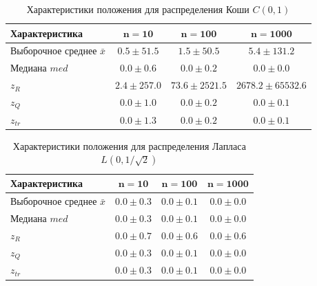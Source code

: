 \documentclass[a4paper, 14pt]{extarticle}
\begin{document}
\begin{table}[H]
    \centering
    \caption{Характеристики положения для распределения Коши $C(0, 1)$}
    \label{tab:res_cauchy}
    \begin{tabular}{|l|c|c|c|}
        \hline
        \textbf{Характеристика} & $\mathbf{n=10}$ & $\mathbf{n=100}$ & $\mathbf{n=1000}$ \\ \hline
        Выборочное среднее $\bar{x}$ & $0.5 \pm 51.5$ & $1.5 \pm 50.5$ & $5.4 \pm 131.2$ \\ \hline
        Медиана $med$ & $0.0 \pm 0.6$ & $0.0 \pm 0.2$ & $0.0 \pm 0.0$ \\ \hline
        $z_R$ & $2.4 \pm 257.0$ & $73.6 \pm 2521.5$ & $2678.2 \pm 65532.6$ \\ \hline
        $z_Q$ & $0.0 \pm 1.0$ & $0.0 \pm 0.2$ & $0.0 \pm 0.1$ \\ \hline
        $z_{tr}$ & $0.0 \pm 1.3$ & $0.0 \pm 0.2$ & $0.0 \pm 0.1$ \\ \hline
    \end{tabular}
\end{table}

\begin{table}[H]
    \centering
    \caption{Характеристики положения для распределения Лапласа $L(0, 1/\sqrt{2})$}
    \label{tab:res_laplace}
    \begin{tabular}{|l|c|c|c|}
        \hline
        \textbf{Характеристика} & $\mathbf{n=10}$ & $\mathbf{n=100}$ & $\mathbf{n=1000}$ \\ \hline
        Выборочное среднее $\bar{x}$ & $0.0 \pm 0.3$ & $0.0 \pm 0.1$ & $0.0 \pm 0.0$ \\ \hline
        Медиана $med$ & $0.0 \pm 0.3$ & $0.0 \pm 0.1$ & $0.0 \pm 0.0$ \\ \hline
        $z_R$ & $0.0 \pm 0.7$ & $0.0 \pm 0.6$ & $0.0 \pm 0.6$ \\ \hline
        $z_Q$ & $0.0 \pm 0.3$ & $0.0 \pm 0.1$ & $0.0 \pm 0.0$ \\ \hline
        $z_{tr}$ & $0.0 \pm 0.3$ & $0.0 \pm 0.1$ & $0.0 \pm 0.0$ \\ \hline
    \end{tabular}
\end{table}
\end{document}
